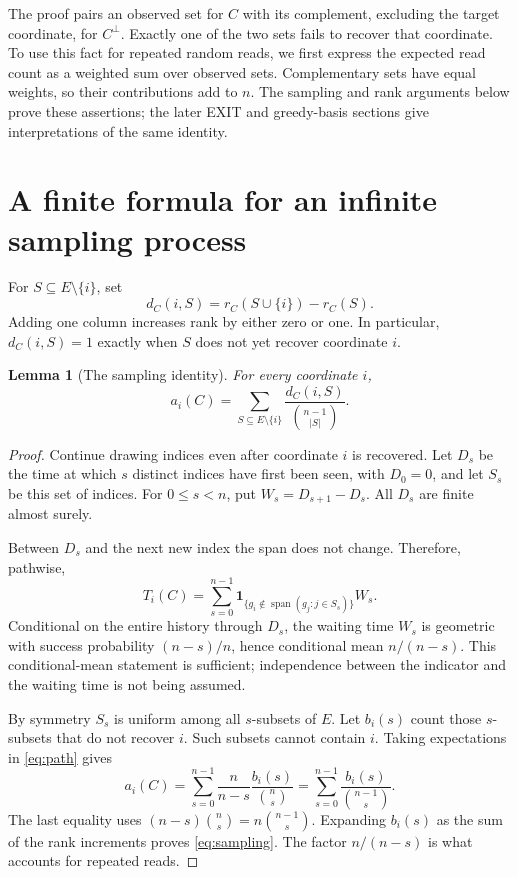 \documentclass[11pt]{article}
\newtheorem{lemma}[theorem]{Lemma}
\theoremstyle{remark}
\newcommand{\spn}{\operatorname{span}}
\newcommand{\ind}{\mathbf 1}
\begin{document}
The proof pairs an observed set for $C$ with its complement, excluding
the target coordinate, for $C^\perp$. Exactly one of the two sets fails
to recover that coordinate. To use this fact for repeated random reads,
we first express the expected read count as a weighted sum over observed
sets. Complementary sets have equal weights, so their contributions add
to $n$. The sampling and rank arguments below prove these assertions;
the later EXIT and greedy-basis sections give interpretations of the same
identity.

\section{A finite formula for an infinite sampling process}
For $S\subseteq E\setminus\{i\}$, set
\[
 d_C(i,S)=r_C(S\cup\{i\})-r_C(S).
\]
Adding one column increases rank by either zero or one. In particular,
$d_C(i,S)=1$ exactly when $S$ does not yet recover coordinate $i$.

\begin{lemma}[The sampling identity]\label{lem:sampling}
For every coordinate $i$,
\begin{equation}\label{eq:sampling}
 a_i(C)=\sum_{S\subseteq E\setminus\{i\}}
              \frac{d_C(i,S)}{\binom{n-1}{|S|}}.
\end{equation}
\end{lemma}
\begin{proof}
Continue drawing indices even after coordinate $i$ is recovered.
Let $D_s$ be the time at which $s$ distinct indices have first been seen,
with $D_0=0$, and let $S_s$ be this set of indices. For $0\leq s<n$, put
$W_s=D_{s+1}-D_s$. All $D_s$ are finite almost surely.

Between $D_s$ and the next new index the span does not change. Therefore,
pathwise,
\begin{equation}\label{eq:path}
 T_i(C)=\sum_{s=0}^{n-1}
       \ind_{\{g_i\notin\spn(g_j:j\in S_s)\}}W_s.
\end{equation}
Conditional on the entire history through $D_s$, the waiting time $W_s$ is
geometric with success probability $(n-s)/n$, hence conditional mean
$n/(n-s)$. This conditional-mean statement is sufficient; independence
between the indicator and the waiting time is not being assumed.

By symmetry $S_s$ is uniform among all $s$-subsets of $E$.
Let $b_i(s)$ count those $s$-subsets that do not recover $i$.
Such subsets cannot contain $i$. Taking expectations in \eqref{eq:path}
gives
\[
 a_i(C)=\sum_{s=0}^{n-1}\frac{n}{n-s}
                    \frac{b_i(s)}{\binom ns}
        =\sum_{s=0}^{n-1}\frac{b_i(s)}{\binom{n-1}s}.
\]
The last equality uses
$(n-s)\binom ns=n\binom{n-1}s$. Expanding $b_i(s)$ as the sum of the rank
increments proves \eqref{eq:sampling}. The factor $n/(n-s)$ is what accounts
for repeated reads.
\end{proof}
\end{document}
